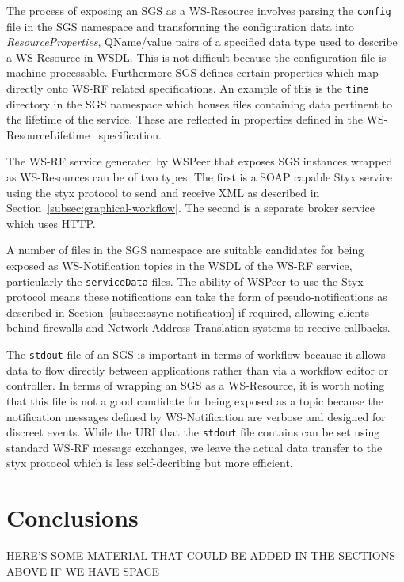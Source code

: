 \documentclass{llncs}
\begin{document}
The process of exposing an SGS as a WS-Resource involves parsing the \texttt{config} file in the SGS namespace and transforming the configuration data into \emph{ResourceProperties}, QName/value pairs of a specified data type used to describe a WS-Resource in WSDL. This is not difficult because the configuration file is machine processable. Furthermore SGS defines certain properties which map directly onto WS-RF related specifications. An example of this is the \texttt{time} directory in the SGS namespace which houses files containing data pertinent to the lifetime of the service. These are reflected in properties defined in the WS-ResourceLifetime~\cite{wsrf-lifetime} specification.

The WS-RF service generated by WSPeer that exposes SGS instances wrapped as WS-Resources can be of two types. The first is a SOAP capable Styx service using the styx protocol to send and receive XML as described in Section~\ref{subsec:graphical-workflow}. The second is a separate broker service which uses HTTP.

A number of files in the SGS namespace are suitable candidates for being exposed as WS-Notification topics in the WSDL of the WS-RF service, particularly the \texttt{serviceData} files. The ability of WSPeer to use the Styx protocol means these notifications can take the form of pseudo-notifications as described in Section~\ref{subsec:async-notification} if required, allowing clients behind firewalls and Network Address Translation systems to receive callbacks.

The \texttt{stdout} file of an SGS is important in terms of workflow because it allows data to flow directly between applications rather than via a workflow editor or controller. In terms of wrapping an SGS as a WS-Resource, it is worth noting that this file is not a good candidate for being exposed as a topic  because the notification messages defined by WS-Notification are verbose and designed for discreet events. While the URI that the \texttt{stdout} file contains can be set using standard WS-RF message exchanges, we leave the actual data transfer to the styx protocol which is less self-decribing but more efficient.

\section{Conclusions}

HERE'S SOME MATERIAL THAT COULD BE ADDED IN THE SECTIONS ABOVE IF WE HAVE SPACE
\end{document}
